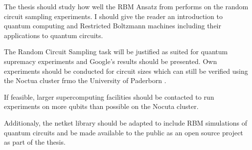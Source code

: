 The thesis should study how well the RBM Ansatz from \cite{jnsson2018neuralnetwork} performs on 
the random circuit sampling experiments. I should give the reader an introduction to 
quantum computing and Restricted Boltzmann machines including their applications to quantum circuits.

The Random Circuit Sampling task will be justified as suited for quantum supremacy experiments and 
Google's results should be presented. Own experiments should be conducted for circuit sizes which
can still be verified using the Noctua cluster frmo the University of Paderborn \cite{noctua2020}.

If feasible, larger supercomputing facilities should be 
contacted to run experiments on more qubits than possible on the Nocuta cluster.

Additionaly, the netket library \cite{netket:2019} should be adapted to include RBM simulations of quantum circuits and be 
made available to the public as an open source project as part of the thesis.